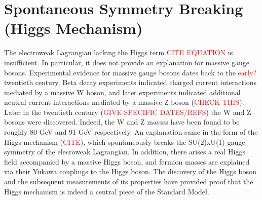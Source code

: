 \section{Spontaneous Symmetry Breaking (Higgs Mechanism)}
The electroweak Lagrangian lacking the Higgs term \textcolor{red}{CITE EQUATION} is insufficient. In particular, it does not provide
an explanation for massive gauge bosons. Experimental evidence for massive gauge bosons dates back to the \textcolor{red}{early?}
twentieth century. Beta decay experiments indicated charged current interactions mediated by a massive W boson, and later experiments 
indicated additional neutral current interactions mediated by a massive Z boson (\textcolor{red}{CHECK THIS}). Later in the twentieth 
century (\textcolor{red}{GIVE SPECIFIC DATES/REFS}) the W and Z bosons were discovered. Indeed, the W and Z masses have been found 
to be roughly 80 GeV and 91 GeV respectively. An explanation came in the form of the Higgs mechanism (\textcolor{red}{CITE}),
which spontaneously breaks the SU(2)xU(1) gauge symmetry of the elecroweak Lagrangian. In addition, there arises a real 
Higgs field accompanied by a massive Higgs boson, and fermion masses are explained via their Yukawa couplings to the Higgs boson. 
The discovery of the Higgs boson and the subsequent measurements of its properties have provided proof that the Higgs mechanism 
is indeed a central piece of the Standard Model. 


